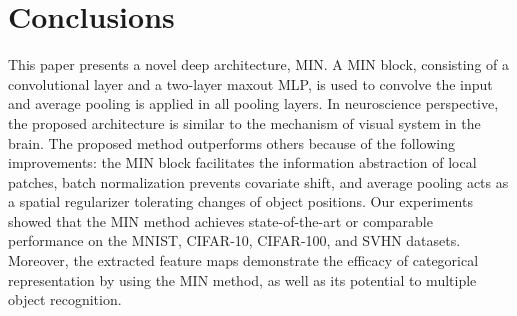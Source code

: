 \documentclass[10pt,twocolumn,letterpaper]{article}
\begin{document}
\section{Conclusions}
 This paper presents a novel deep architecture, MIN. A MIN block, consisting of a convolutional layer and a two-layer maxout MLP, is used to convolve the input and average pooling is applied in all pooling layers. In neuroscience perspective, the proposed architecture is similar to the mechanism of visual system in the brain. 
The proposed method outperforms others because of the following improvements: the MIN block facilitates the information abstraction of local patches, batch normalization prevents covariate shift, and average pooling acts as a spatial regularizer tolerating changes of object positions. Our experiments showed that the MIN method achieves state-of-the-art or comparable performance on the MNIST, CIFAR-10, CIFAR-100, and SVHN datasets. Moreover, the extracted feature maps demonstrate the efficacy of categorical representation by using the MIN method, as well as its potential to multiple object recognition.




{\small


}
\end{document}

